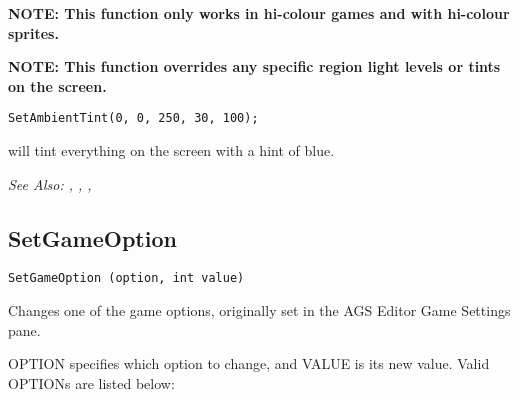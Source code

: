 \bf{NOTE:} This function only works in hi-colour games and with hi-colour sprites.

\bf{NOTE:} This function overrides any specific region light levels or tints on the screen.

\begin{verbatim}
SetAmbientTint(0, 0, 250, 30, 100);
\end{verbatim}
will tint everything on the screen with a hint of blue.

\it{See Also:} ,
,
,



\subsection{SetGameOption}\label{SetGameOption}%

\begin{verbatim}
SetGameOption (option, int value)
\end{verbatim}

Changes one of the game options, originally set in the AGS Editor Game Settings pane.

OPTION specifies which option to change, and VALUE is its new value. Valid OPTIONs are
listed below:

